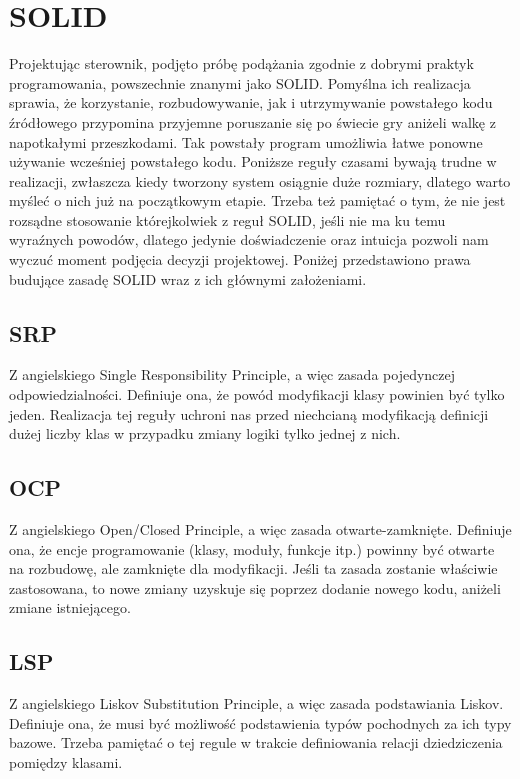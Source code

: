 \chapter{SOLID}
Projektując sterownik, podjęto próbę podążania zgodnie z dobrymi praktyk programowania, powszechnie znanymi jako SOLID.
Pomyślna ich realizacja sprawia, że korzystanie, rozbudowywanie, jak i utrzymywanie powstałego kodu źródłowego przypomina
przyjemne poruszanie się po świecie gry aniżeli walkę z napotkałymi przeszkodami. 
Tak powstały program umożliwia łatwe ponowne używanie wcześniej powstałego kodu.
Poniższe reguły czasami bywają trudne w realizacji, zwłaszcza kiedy tworzony system osiągnie duże rozmiary, dlatego warto myśleć o nich już na początkowym etapie. 
Trzeba też pamiętać o tym, że nie jest rozsądne stosowanie którejkolwiek z reguł SOLID, jeśli nie ma ku temu wyraźnych powodów, dlatego 
jedynie doświadczenie oraz intuicja pozwoli nam wyczuć moment podjęcia decyzji projektowej.
Poniżej przedstawiono prawa budujące zasadę SOLID wraz z ich głównymi założeniami.

\section{SRP}
Z angielskiego Single Responsibility Principle, a więc zasada pojedynczej odpowiedzialności.
Definiuje ona, że powód modyfikacji klasy powinien być tylko jeden.
\cite[103]{martin2015zwinne}
Realizacja tej reguły uchroni nas przed niechcianą modyfikacją definicji dużej liczby klas w przypadku zmiany logiki tylko jednej z nich.

\section{OCP}
Z angielskiego Open/Closed Principle, a więc zasada otwarte-zamknięte.
Definiuje ona, że encje programowanie (klasy, moduły, funkcje itp.) powinny być otwarte na rozbudowę, ale zamknięte dla modyfikacji.
\cite[117]{martin2015zwinne}
Jeśli ta zasada zostanie właściwie zastosowana, to nowe zmiany uzyskuje się poprzez dodanie nowego kodu, aniżeli zmiane istniejącego. 

\section{LSP}
Z angielskiego Liskov Substitution Principle, a więc zasada podstawiania Liskov.
Definiuje ona, że musi być możliwość podstawienia typów pochodnych za ich typy bazowe.
\cite[127]{martin2015zwinne}
Trzeba pamiętać o tej regule w trakcie definiowania relacji dziedziczenia pomiędzy klasami.

